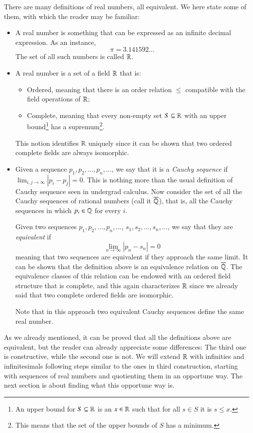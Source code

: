 \documentclass[adraft, copyright,creativecommons,sharealike,noncommercial]{Preambles/eptcs}
\begin{document}
There are many definitions of real numbers, all equivalent. We here state some of them, with which the reader may be familiar:
\begin{itemize}
	\item A real number is something that can be expressed as an infinite decimal expression. As an instance,
	\begin{equation*}
		\pi = 3.141592\dots
	\end{equation*}
	The set of all such numbers is called $\mathbb{R}$.
	
	\item A real number is a set of a field $\mathbb{R}$ that is:
	\begin{itemize}
		\item Ordered, meaning that there is an order relation $\leq$ compatible with the field operations of $\mathbb{R}$;
		\item Complete, meaning that every non-empty set $S \subseteq \mathbb{R}$ with an upper bound\footnote{An upper bound for $S \subseteq \mathbb{R}$ is an $x \in \mathbb{R}$ such that for all $s \in S$ it is $s \leq x$.} has a supremum\footnote{This means that the set of the upper bounds of $S$ has a minimum.}.
	\end{itemize}
	 This notion identifies $\mathbb{R}$ uniquely since it can be shown that two ordered complete fields are always isomorphic.
	 
	 \item Given a sequence $p_1, p_2, \dots, p_n, \dots$, we say that it is a \emph{Cauchy sequence} if $\lim_{i,j \to \infty} | p_i - p_j | = 0$. This is nothing more than the usual definition of Cauchy sequence seen in undergrad calculus. Now consider the set of all the Cauchy sequences of rational numbers (call it $\overline{\mathbb{Q}}$), that is, all the Cauchy sequences in which $p_i \in \mathbb{Q}$ for every $i$. 
	 
	 Given two sequences $p_1, p_2, \dots, p_n, \dots$, $s_1, s_2, \dots, s_n, \dots$, we say that they are \emph{equivalent} if
	 \begin{equation*}
	 	\lim_{n \to \infty} |p_n - s_n | = 0
	 \end{equation*}
	 meaning that two sequences are equivalent if they approach the same limit. It can be shown that the definition above is an equivalence relation on $\overline{\mathbb{Q}}$. The equivalence classes of this relation can be endowed with an ordered field structure that is complete, and this again characterizes $\mathbb{R}$ since we already said that two complete ordered fields are isomorphic.
	 
	 Note that in this approach two equivalent Cauchy sequences define the same real number.
 \end{itemize}
As we already mentioned, it can be proved that all the definitions above are equivalent, but the reader can already appreciate some differences: The third one is constructive, while the second one is not. We will extend $\mathbb{R}$ with infinities and infinitesimals following steps similar to the ones in third construction, starting with sequences of real numbers and quotienting them in an opportune way. The next section is about finding what this opportune way is.
\end{document}
